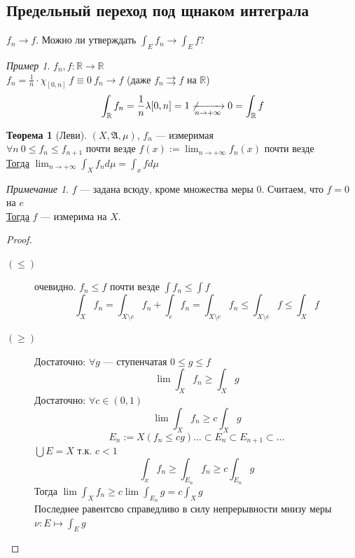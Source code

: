 \documentclass[oneside]{book}
\newcommand{\R}{\mathbb{R}}
\newcommand{\A}{\mathfrak{A}}
\theoremstyle{plain}
\theoremstyle{remark}
\newtheorem*{remark}{Примечание}
\newtheorem*{examp}{Пример}
\theoremstyle{definition}
\newtheorem{theorem}{Теорема}[section]
\begin{document}
\subsection{Предельный переход под щнаком интеграла}
\label{sec:orgcb0378d}
\(f_n \to f\). Можно ли утверждать \(\int_E f_n \to \int_E f\)?
\begin{examp}
\(f_n, f: \R \to \R\) \\
\(f_n = \frac{1}{n} \cdot \chi_{[0, n]}\ f\equiv 0\ f_n \to f\) (даже \(f_n \rightrightarrows f\) на \(\R\)) \\
\[ \int_\R f_n = \frac{1}{n}\lambda[0, n] = 1\not \xrightarrow[n \to + \infty]{} 0 = \int_\R f \]
\end{examp}
\begin{theorem}[Леви]
\((X, \A, \mu)\), \(f_n\) --- измеримая \\
\(\forall n\ 0 \le f_n \le f_{n + 1}\)  почти везде \(f(x) := \lim_{n\to + \infty} f_n(x)\) почти везде \\
\uline{Тогда} \(\lim_{n \to + \infty}\int_X f_n d \mu = \int_x fd\mu\)
\end{theorem}
\begin{remark}
\(f\) --- задана всюду, кроме множества меры \(0\). Считаем, что \(f = 0\) на \(e\) \\
\uline{Тогда} \(f\) --- измерима на \(X\).
\end{remark}
\begin{proof}
\-
\begin{description}
\item[{\((\le)\)}] очевидно. \(f_n \le f\) почти везде \(\int f_n \le \int f\)
\[ \int_X f_n = \int_{X\setminus e}f_n + \int_e f_n = \int_{X\setminus e} f_n \le \int_{X \setminus e} f \le \int_X f \]
\item[{\((\ge)\)}] Достаточно: \(\forall g\) --- ступенчатая \(0 \le g \le f\)
\[ \lim \int_X f_n \ge \int_X g \]
Достаточно: \(\forall c \in (0, 1)\)
\[ \lim \int_X f_n \ge c \int_X g \]
\[ E_n := X(f_n \le c g) \dots \subset E_n \subset E_{n + 1} \subset \dots \]
\(\bigcup E = X\) т.к. \(c < 1\)
\[ \int_x f_n \ge \int_{E_n} f_n \ge c \int_{E_n} g \]
Тогда \(\lim \int_X f_n \ge c \lim \int_{E_n} g = c\int_X g\) \\
Последнее равентсво справедливо в силу непрерывности мнизу меры \(\nu: E \mapsto \int_E g\)
\end{description}
\end{proof}
\end{document}
